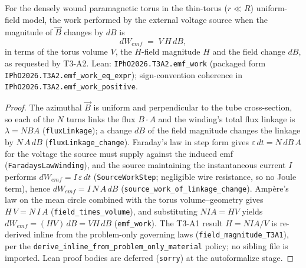 \begin{theorem}
\label{thm:physics:ipho_2026_t3_a2:target}
\leanok
For the densely wound paramagnetic torus in the thin-torus ($r \ll R$)
uniform-field model, the work performed by the external voltage source when
the magnitude of $\vec B$ changes by $dB$ is
\[
  dW_{emf} \;=\; V\,H\,dB,
\]
in terms of the torus volume $V$, the $H$-field magnitude $H$ and the field
change $dB$, as requested by T3-A2.  Lean:
\texttt{IPhO2026.T3A2.emf\_work} (packaged form
\texttt{IPhO2026.T3A2.emf\_work\_eq\_expr}); sign-convention coherence in
\texttt{IPhO2026.T3A2.emf\_work\_positive}.
\end{theorem}
\begin{proof}
\leanok
The azimuthal $\vec B$ is uniform and perpendicular to the tube cross-section,
so each of the $N$ turns links the flux $B \cdot A$ and the winding's total
flux linkage is $\lambda = N B A$ (\texttt{fluxLinkage}); a change $dB$ of the
field magnitude changes the linkage by $N\,A\,dB$
(\texttt{fluxLinkage\_change}).  Faraday's law in step form gives
$\varepsilon\,dt = N\,dB\,A$ for the voltage the source must supply against
the induced emf (\texttt{FaradaysLawWinding}), and the source maintaining the
instantaneous current $I$ performs $dW_{emf} = I\,\varepsilon\,dt$
(\texttt{SourceWorkStep}; negligible wire resistance, so no Joule term), hence
$dW_{emf} = I\,N\,A\,dB$ (\texttt{source\_work\_of\_linkage\_change}).
Ampère's law on the mean circle combined with the torus volume--geometry gives
$H\,V = N\,I\,A$ (\texttt{field\_times\_volume}), and substituting
$N I A = H V$ yields $dW_{emf} = (H V)\,dB = V H\,dB$ (\texttt{emf\_work}).
The T3-A1 result $H = NIA/V$ is re-derived inline from the problem-only
governing laws (\texttt{field\_magnitude\_T3A1}), per the
\texttt{derive\_inline\_from\_problem\_only\_material} policy; no sibling file
is imported.  Lean proof bodies are deferred (\texttt{sorry}) at the
autoformalize stage.
\end{proof}
